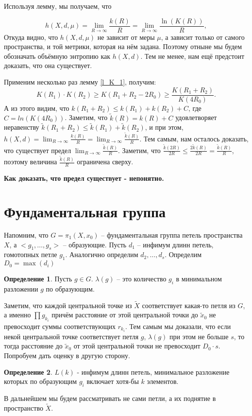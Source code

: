 \documentclass[11pt]{article}
\theoremstyle{definition}
\newtheorem{defin}{Определение}%
\theoremstyle{plain}
\theoremstyle{plain}
\def\leq{\leqslant}
\def\geq{\geqslant}
\def\wt#1{\widetilde{#1}}
\begin{document}
Используя лемму, мы получаем, что 

$$
	h(X, d, \mu) = \lim_{R \rightarrow \infty} \frac{k(R)} {R} = \lim_{R \rightarrow \infty} \frac{\ln (K(R))} {R},
$$
Откуда видно, что $h(X, d, \mu)$ не зависит от меры $\mu$, а зависит только от самого пространства, и той метрики, которая на нём задана.
Поэтому отныне мы будем обозначать объёмную энтропию как $h(X, d)$.
Тем не менее, нам ещё предстоит доказать, что она существует.

Применим несколько раз лемму \ref{l_K_1}, получим:
$$
  K(R_1) \cdot K(R_2) \geq K(R_1 + R_2 - 2 R_0) \geq \frac{K(R_1 + R_2)}{K(4 R_0)}.
$$
А из этого видим, что $k(R_1 + R_2) \leq k(R_1) + k(R_2) + C$, где $C = ln(K(4 R_0))$.
Заметим, что $\wt{k}(R) = k(R) + C$ удовлетворяет неравенству $\wt{k}(R_1 + R_2) \leq \wt{k}(R_1) + \wt{k}(R_2)$, и при этом,
$h(X,d) = \lim_{R \rightarrow \infty} \frac{k(R)}{R} = \lim_{R \rightarrow \infty} \frac{\wt{k}(R)}{R}$.
Тем самым, нам осталось доказать, что существует предел $\lim_{R \rightarrow \infty} \frac{\wt{k}(R)}{R}$.
Заметим, что $\frac{\wt{k}(2R)}{2R} \leq \frac{2\wt{k}(R)}{2R} = \frac{\wt{k}(R)}{R}$, поэтому величина $\frac{\wt{k}(R)}{R}$ ограничена сверху.

{\bf Как доказать, что предел существует - непонятно.}


\section{Фундаментальная группа}
Напомним, что $G = \pi_1(X, x_0)$ -- фундаментальная группа петель пространства $X$, а $<g_1,\dots,g_s>$ -- образующие.
Пусть $d_1$ -- инфимум длинн петель, гомотопных петле $g_1$. Аналогично определим $d_2,\dots,d_s$.
Определим $D_0 = \max(d_i)$
\begin{defin}
Пусть $g \in G$. $\lambda(g)$ -- это количество $g_i$ в минимальном разложении $g$ по образующим.
\end{defin}
Заметим, что каждой центральной точке из $\wt{X}$ соответствует какая-то петля из $G$, а именно $\prod g_{k_i}$ 
причём расстояние от этой центральной точки до $\wt{x}_0$ не превосходит суммы соответствующих $r_{k_i}$. 
Тем самым мы доказали, что если некой центральной точке соответствует петля $g$,
$\lambda(g)$ при этом не больше $s$, то тогда расстояние до $\wt{x}_0$ от этой центральной точки не превосходит $D_0 \cdot s$.
Попробуем дать оценку в другую сторону.

\begin{defin}
	$L(k)$ - инфимум длинн петель, минимальное разложение которых по образующим $g_i$ включает хотя-бы $k$ элементов.
\end{defin}
В дальнейшем мы будем рассматривать не сами петли, а их поднятие в пространство $\wt{X}$.
\end{document}
